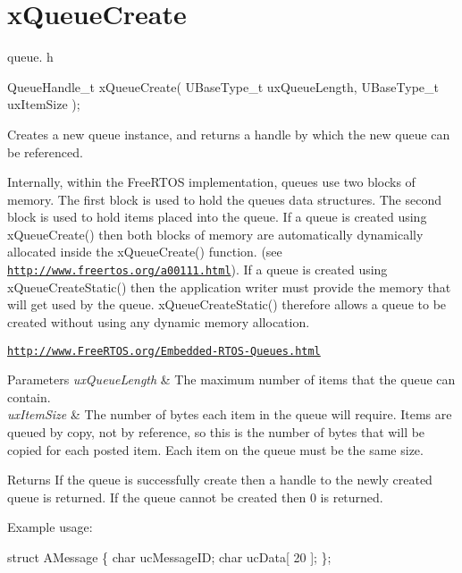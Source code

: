 \hypertarget{group__xQueueCreate}{}\section{x\+Queue\+Create}
\label{group__xQueueCreate}
queue. h 
\begin{DoxyPre}
QueueHandle\_t xQueueCreate(
                          UBaseType\_t uxQueueLength,
                          UBaseType\_t uxItemSize
                      );
  \end{DoxyPre}


Creates a new queue instance, and returns a handle by which the new queue can be referenced.

Internally, within the Free\+R\+T\+OS implementation, queues use two blocks of memory. The first block is used to hold the queue\textquotesingle{}s data structures. The second block is used to hold items placed into the queue. If a queue is created using x\+Queue\+Create() then both blocks of memory are automatically dynamically allocated inside the x\+Queue\+Create() function. (see \href{http://www.freertos.org/a00111.html}{\tt http\+://www.\+freertos.\+org/a00111.\+html}). If a queue is created using x\+Queue\+Create\+Static() then the application writer must provide the memory that will get used by the queue. x\+Queue\+Create\+Static() therefore allows a queue to be created without using any dynamic memory allocation.

\href{http://www.FreeRTOS.org/Embedded-RTOS-Queues.html}{\tt http\+://www.\+Free\+R\+T\+O\+S.\+org/\+Embedded-\/\+R\+T\+O\+S-\/\+Queues.\+html}


\begin{DoxyParams}{Parameters}
{\em ux\+Queue\+Length} & The maximum number of items that the queue can contain.\\
\hline
{\em ux\+Item\+Size} & The number of bytes each item in the queue will require. Items are queued by copy, not by reference, so this is the number of bytes that will be copied for each posted item. Each item on the queue must be the same size.\\
\hline
\end{DoxyParams}
\begin{DoxyReturn}{Returns}
If the queue is successfully create then a handle to the newly created queue is returned. If the queue cannot be created then 0 is returned.
\end{DoxyReturn}
Example usage\+: 
\begin{DoxyPre}
struct AMessage
\{
   char ucMessageID;
   char ucData[ 20 ];
\};\end{DoxyPre}



